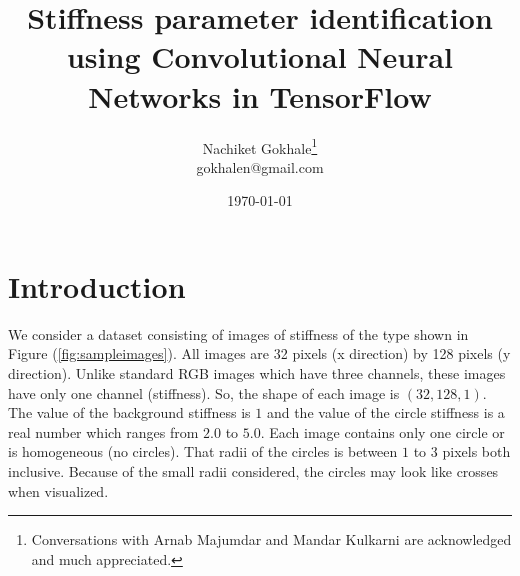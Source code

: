 \documentclass{article}
\begin{document}
\title{Stiffness parameter identification using Convolutional Neural Networks in TensorFlow}
\author{Nachiket Gokhale\footnote{Conversations with Arnab Majumdar and Mandar Kulkarni are acknowledged and much appreciated.}\\gokhalen@gmail.com}
\date{\today}
\maketitle
\section{Introduction}
We consider a dataset consisting of images of stiffness of the type shown in Figure (\ref{fig:sampleimages}). All images are 32 pixels (x direction) by 128 pixels (y direction). Unlike standard RGB images which have three channels, these images have only one channel (stiffness). So, the shape of each image is $(32,128,1)$. The value of the background stiffness is $1$ and the value of the circle stiffness is a real number which ranges from $2.0$ to $5.0$. Each image contains only one circle or is homogeneous (no circles). That radii of the circles is between $1$ to $3$ pixels both inclusive. Because of the small radii considered, the circles may look like crosses when visualized.\\
\end{document}
